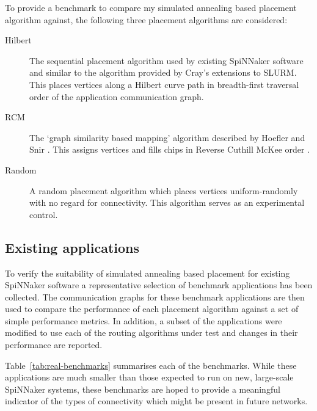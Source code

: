 			To provide a benchmark to compare my simulated annealing based placement
			algorithm against, the following three placement algorithms are
			considered:
			
			\begin{description}
				
				\item[Hilbert] The sequential placement algorithm used by existing
				SpiNNaker software and similar to the algorithm provided by Cray's
				extensions to SLURM. This places vertices along a Hilbert curve path in
				breadth-first traversal order of the application communication graph.
				
				\item[RCM] The `graph similarity based mapping' algorithm described by
				Hoefler and Snir \cite{hoefler11}. This assigns vertices and fills
				chips in Reverse Cuthill McKee order \cite{cuthill69}.
				
				\item[Random] A random placement algorithm which places vertices
				uniform-randomly with no regard for connectivity. This algorithm serves
				as an experimental control.
				
			\end{description}
			
		\subsection{Existing applications}
			
			\label{sec:existing-applications}
			
			To verify the suitability of simulated annealing based placement for
			existing SpiNNaker software a representative selection of benchmark
			applications has been collected. The communication graphs for these
			benchmark applications are then used to compare the performance of each
			placement algorithm against a set of simple performance metrics. In
			addition, a subset of the applications were modified to use each of the
			routing algorithms under test and changes in their performance are
			reported.
			
			Table~\ref{tab:real-benchmarks} summarises each of the benchmarks. While
			these applications are much smaller than those expected to run on new,
			large-scale SpiNNaker systems, these benchmarks are hoped to provide a
			meaningful indicator of the types of connectivity which might be present
			in future networks.
			
